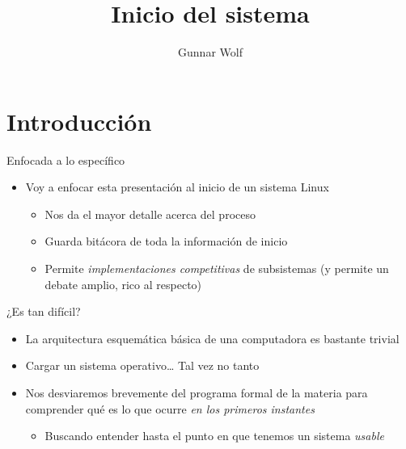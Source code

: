 \documentclass[presentation]{beamer}
\author{Gunnar Wolf}
\date{}
\title{Inicio del sistema}
\begin{document}
\maketitle

\section{Introducción}
\label{sec:orgc7e0c02}
\begin{frame}[label={sec:org94769c8}]{Enfocada a lo específico}
\begin{itemize}
\item Voy a enfocar esta presentación al inicio de un sistema Linux
\begin{itemize}
\item Nos da el mayor detalle acerca del proceso
\item Guarda bitácora de toda la información de inicio
\item Permite \emph{implementaciones competitivas} de subsistemas (y permite
un debate amplio, rico al respecto)
\end{itemize}
\end{itemize}
\end{frame}

\begin{frame}[label={sec:org8e0fb14}]{¿Es tan difícil?}
\begin{itemize}
\item La arquitectura esquemática básica de una computadora es bastante
trivial
\item Cargar un sistema operativo\ldots{} Tal vez no tanto
\item Nos desviaremos brevemente del programa formal de la materia para
comprender qué es lo que ocurre \emph{en los primeros instantes}
\begin{itemize}
\item Buscando entender hasta el punto en que tenemos un sistema
\emph{usable}
\end{itemize}
\end{itemize}
\end{frame}
\end{document}
